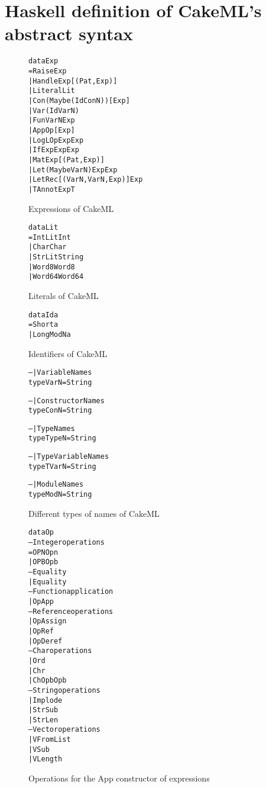\chapter{Haskell definition of CakeML's abstract syntax}
\label{app:ASTExp}

\begin{figure}
\begin{alltt}
data Exp
  = Raise Exp
  | Handle Exp [(Pat, Exp)]
  | Literal Lit
  | Con (Maybe (Id ConN)) [Exp]
  | Var (Id VarN)
  | Fun VarN Exp
  | App Op [Exp]
  | Log LOp Exp Exp
  | If Exp Exp Exp
  | Mat Exp [(Pat, Exp)]
  | Let (Maybe VarN) Exp Exp
  | LetRec [(VarN, VarN, Exp)] Exp
  | TAnnot Exp T
\end{alltt}
\caption{Expressions of CakeML}
\end{figure}

\begin{figure}
\begin{alltt}
data Lit
  = IntLit Int
  | Char Char
  | StrLit String
  | Word8 Word8
  | Word64 Word64
\end{alltt}
\caption{Literals of CakeML}
\end{figure}

\begin{figure}
\begin{alltt}
data Id a
  = Short a
  | Long ModN a
\end{alltt}
\caption{Identifiers of CakeML}
\end{figure}

\begin{figure}
\begin{alltt}
-- | Variable Names
type VarN = String

-- | Constructor Names
type ConN = String

-- | Type Names
type TypeN = String

-- | Type Variable Names
type TVarN = String

-- | Module Names
type ModN = String
\end{alltt}
\caption{Different types of names of CakeML}
\end{figure}


\begin{figure}
\begin{alltt}
data Op
  -- Integer operations
  = OPN Opn
  | OPB Opb
  -- Equality
  | Equality
  -- Function application
  | OpApp
  -- Reference operations
  | OpAssign
  | OpRef
  | OpDeref
  -- Char operations
  | Ord
  | Chr
  | ChOpb Opb
  -- String operations
  | Implode
  | StrSub
  | StrLen
  -- Vector operations
  | VFromList
  | VSub
  | VLength
\end{alltt}
\caption{Operations for the App constructor of expressions}
\end{figure}

